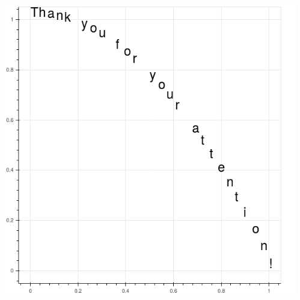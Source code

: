 \documentclass[11pt]{beamer}
\begin{document}
\begin{frame}
\begin{columns}
\begin{column}{.5\textwidth}
\includegraphics[width=\textwidth]{Pictures/thanks.png}
\end{column}
\begin{column}{.5\textwidth}

\end{column}
\end{columns}

\end{frame}
\end{document}
